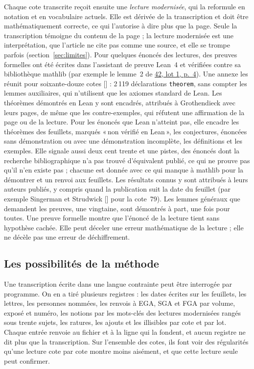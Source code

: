 \documentclass[11pt]{amsart}
\makeatletter
\newcommand{\mot}[1]{«\,#1\,»}
\def\RHM@first#1--#2\@nil{#1}
\DeclareRobustCommand{\lot}[3]{\begingroup\edef\RHM@pdfpage{\the\numexpr\RHM@first#3--\@nil+1\relax}\href{https://grothendieck.umontpellier.fr/#1.pdf\#page=\RHM@pdfpage}{#1, lot #2, p.~#3}\endgroup}
\newcommand{\lot}[3]{\href{https://grothendieck.commutator.io/\##1/#2/p#3}{#1, lot #2, p.~#3}}
\newcommand{\autocite}[1]{\citealp{hua2026#1}}
\makeatother
\begin{document}
Chaque cote transcrite reçoit ensuite une \emph{lecture modernisée}, qui la reformule en notation et en vocabulaire actuels. Elle est dérivée de la transcription et doit être mathématiquement correcte, ce qui l'autorise à dire plus que la page. Seule la transcription témoigne du contenu de la page ; la lecture modernisée est une interprétation, que l'article ne cite pas comme une source, et elle se trompe parfois (section~\ref{sec:limites}). Pour quelques énoncés des lectures, des preuves formelles ont été écrites dans l'assistant de preuve Lean~4 et vérifiées contre sa bibliothèque mathlib (par exemple le lemme~2 de \lot{42}{1}{4}). Une annexe les réunit pour soixante-douze cotes [\autocite{b}] : 2\,119 déclarations \texttt{theorem}, sans compter les lemmes auxiliaires, qui n'utilisent que les axiomes standard de Lean. Les théorèmes démontrés en Lean y sont encadrés, attribués à Grothendieck avec leurs pages, de même que les contre-exemples, qui réfutent une affirmation de la page ou de la lecture. Pour les énoncés que Lean n'atteint pas, elle encadre les théorèmes des feuillets, marqués \mot{non vérifié en Lean}, les conjectures, énoncées sans démonstration ou avec une démonstration incomplète, les définitions et les exemples. Elle signale aussi deux cent trente et une pistes, des énoncés dont la recherche bibliographique n'a pas trouvé d'équivalent publié, ce qui ne prouve pas qu'il n'en existe pas ; chacune est donnée avec ce qui manque à mathlib pour la démontrer et un renvoi aux feuillets. Les résultats connus y sont attribués à leurs auteurs publiés, y compris quand la publication suit la date du feuillet (par exemple Singerman et Strudwick [\citealp{singermanstrudwick2020}] pour la cote~79). Les lemmes généraux que demandent les preuves, une vingtaine, sont démontrés à part, une fois pour toutes. Une preuve formelle montre que l'énoncé de la lecture tient sans hypothèse cachée. Elle peut déceler une erreur mathématique de la lecture ; elle ne décèle pas une erreur de déchiffrement.

\subsection{Les possibilités de la méthode}

Une transcription écrite dans une langue contrainte peut être interrogée par programme. On en a tiré plusieurs registres : les dates écrites sur les feuillets, les lettres, les personnes nommées, les renvois à EGA, SGA et FGA par volume, exposé et numéro, les notions par les mots-clés des lectures modernisées rangés sous trente sujets, les ratures, les ajouts et les illisibles par cote et par lot. Chaque entrée renvoie au fichier et à la ligne qui la fondent, et aucun registre ne dit plus que la transcription. Sur l'ensemble des cotes, ils font voir des régularités qu'une lecture cote par cote montre moins aisément, et que cette lecture seule peut confirmer.
\end{document}
